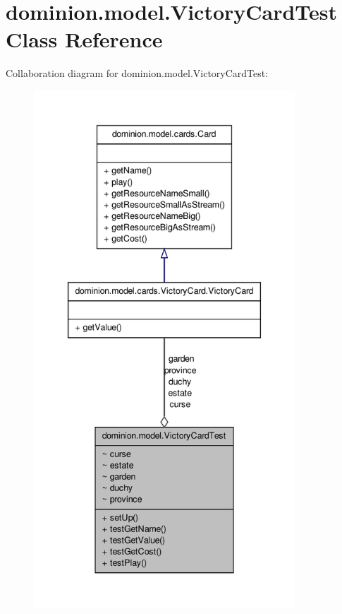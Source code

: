 \hypertarget{classdominion_1_1model_1_1VictoryCardTest}{\section{dominion.\-model.\-Victory\-Card\-Test \-Class \-Reference}
\label{classdominion_1_1model_1_1VictoryCardTest}
}


\-Collaboration diagram for dominion.\-model.\-Victory\-Card\-Test\-:
\nopagebreak
\begin{figure}[H]
\begin{center}
\leavevmode
\includegraphics[height=550pt]{classdominion_1_1model_1_1VictoryCardTest__coll__graph}
\end{center}
\end{figure}
